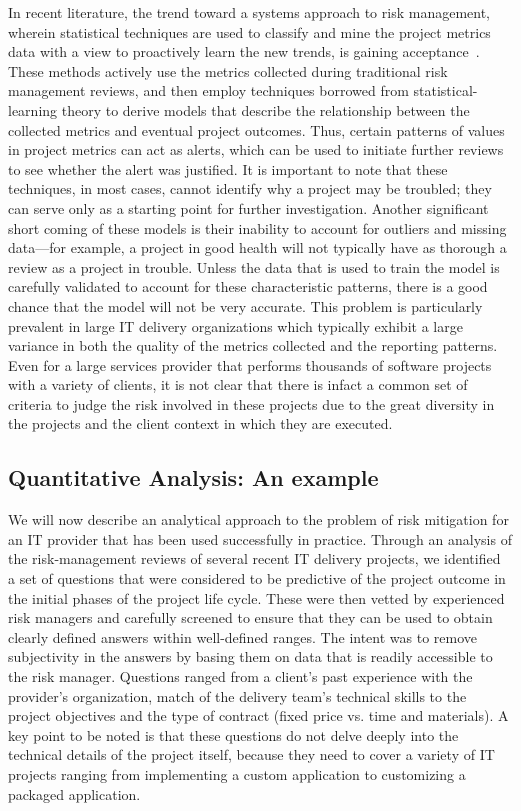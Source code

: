 In recent literature, the trend toward a systems approach to risk management,
wherein statistical techniques are used to classify and mine the project metrics
data with a view to proactively learn the new trends, is gaining
acceptance~\cite{risk8,risk9,risk10}.  These methods actively use the metrics
collected during traditional risk management reviews, and then employ techniques
borrowed from statistical-learning theory to derive models that describe the
relationship between the collected metrics and eventual project outcomes. Thus,
certain patterns of values in project metrics can act as alerts, which can be
used to initiate further reviews to see whether the alert was justified. It is
important to note that these techniques, in most cases, cannot identify why a
project may be troubled; \ie they can serve only as a starting point for further
investigation.  Another significant short coming of these models is their
inability to account for outliers and missing data---for example, a project in
good health will not typically have as thorough a review as a project in
trouble. Unless the data that is used to train the model is carefully validated
to account for these characteristic patterns, there is a good chance that the
model will not be very accurate. This problem is particularly prevalent in large
IT delivery organizations which typically exhibit a large variance in both the
quality of the metrics collected and the reporting patterns. Even for a large
services provider that performs thousands of software projects with a variety of
clients, it is not clear that there is infact a common set of criteria to judge
the risk involved in these projects due to the great diversity in the projects
and the client context in which they are executed.

\subsection{Quantitative Analysis: An example}

We will now describe an analytical approach to the problem of risk mitigation
for an IT provider that has been used successfully in practice. Through an
analysis of the risk-management reviews of several recent IT delivery projects,
we identified a set of questions that were considered to be predictive of the
project outcome in the initial phases of the project life cycle. These were then
vetted by experienced risk managers and carefully screened to ensure that they
can be used to obtain clearly defined answers within well-defined ranges. The
intent was to remove subjectivity in the answers by basing them on data that is
readily accessible to the risk manager.  Questions ranged from a client's past
experience with the provider's organization, match of the delivery team's
technical skills to the project objectives and the type of contract (fixed price
vs. time and materials).  A key point to be noted is that these questions do not
delve deeply into the technical details of the project itself, because they need
to cover a variety of IT projects ranging from implementing a custom application
to customizing a packaged application.

